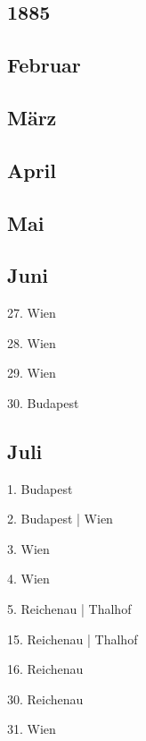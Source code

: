 \documentclass[twoside=false,titlepage=false,open=any, parskip=never, fontsize=10pt, headings=small, chapterprefix=false, appendixprefix=false, DIV=15]{scrbook}
\begin{document}
\begin{multicols}{3}
            \chapter*{1885}
            \section*{Februar}
            \section*{März}
            \section*{April}
            \section*{Mai}
            \section*{Juni}
            27. Wien\par
            28. Wien\par
            29. Wien\par
            30. Budapest\par
            \section*{Juli}
            1. Budapest\par
            2. Budapest | Wien\par
            3. Wien\par
            4. Wien\par
            5. Reichenau | Thalhof\par
            15. Reichenau | Thalhof\par
            16. Reichenau\par
            30. Reichenau\par
            31. Wien\par

\end{multicols}
\end{document}

